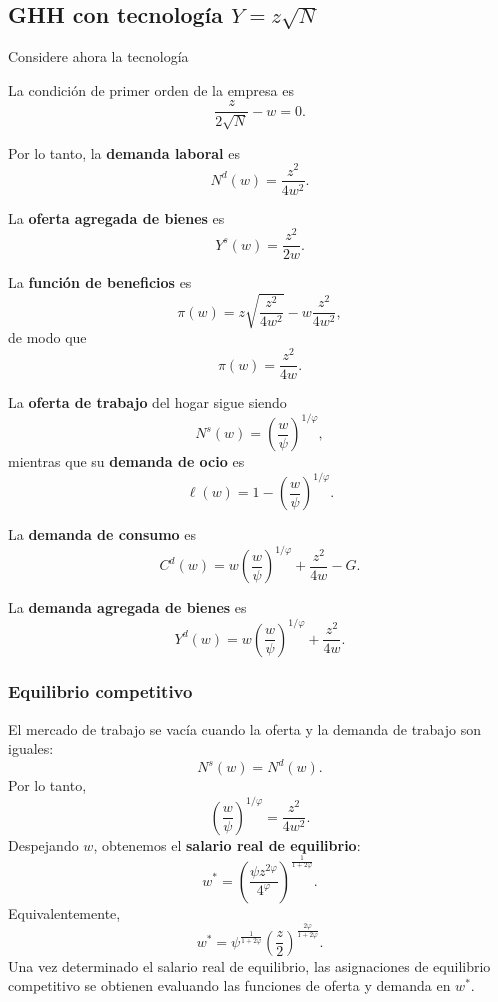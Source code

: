 \documentclass[11pt]{article}
\begin{document}
\subsection{GHH con tecnología $Y=z\sqrt{N}$}

Considere ahora la tecnología

La condición de primer orden de la empresa es
\[
\frac{z}{2\sqrt{N}}-w=0.
\]

Por lo tanto, la \textbf{demanda laboral} es
\[
\boxed{
N^d(w)=\frac{z^2}{4w^2}
}.
\]

La \textbf{oferta agregada de bienes} es
\[
\boxed{
Y^s(w)=\frac{z^2}{2w}
}.
\]

La \textbf{función de beneficios} es
\[
\pi(w)
=
z\sqrt{\frac{z^2}{4w^2}}
-
w\frac{z^2}{4w^2},
\]
de modo que
\[
\boxed{
\pi(w)=\frac{z^2}{4w}
}.
\]

La \textbf{oferta de trabajo} del hogar sigue siendo
\[
\boxed{
N^s(w)
=
\left(\frac{w}{\psi}\right)^{1/\varphi}
},
\]
mientras que su \textbf{demanda de ocio} es
\[
\boxed{
\ell(w)
=
1-
\left(\frac{w}{\psi}\right)^{1/\varphi}
}.
\]

La \textbf{demanda de consumo} es
\[
\boxed{
C^d(w)
=
w
\left(\frac{w}{\psi}\right)^{1/\varphi}
+
\frac{z^2}{4w}
-G
}.
\]

La \textbf{demanda agregada de bienes} es
\[
\boxed{
Y^d(w)
=
w
\left(\frac{w}{\psi}\right)^{1/\varphi}
+
\frac{z^2}{4w}
}.
\]

\subsubsection*{Equilibrio competitivo}

El mercado de trabajo se vacía cuando la oferta y la demanda de trabajo son
iguales:
\[
N^s(w)=N^d(w).
\]
Por lo tanto,
\[
\left(\frac{w}{\psi}\right)^{1/\varphi}
=
\frac{z^2}{4w^2}.
\]
Despejando $w$, obtenemos el \textbf{salario real de equilibrio}:
\[
\boxed{
w^*
=
\left(
\frac{\psi z^{2\varphi}}{4^\varphi}
\right)^{\frac{1}{1+2\varphi}}
}.
\]
Equivalentemente,
\[
\boxed{
w^*
=
\psi^{\frac{1}{1+2\varphi}}
\left(\frac{z}{2}\right)^{\frac{2\varphi}{1+2\varphi}}
}.
\]
Una vez determinado el salario real de equilibrio, las asignaciones de equilibrio competitivo se obtienen evaluando las funciones de oferta y demanda en $w^*$.
\end{document}
